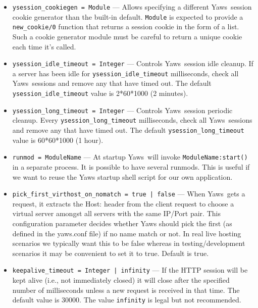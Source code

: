 \documentclass[11pt,oneside,english]{book}
\newcommand{\Yaws}            %
        {{\sc Yaws}}
\begin{document}
\begin{itemize}
\item        \verb+ysession_cookiegen = Module+ ---
               Allows specifying a different \Yaws\ session cookie
               generator than the built-in default. \verb+Module+ is
               expected to provide a \verb+new_cookie/0+ function that
               returns a session cookie in the form of a list. Such a
               cookie generator module must be careful to return a unique
               cookie each time it's called.

\item       \verb+ysession_idle_timeout = Integer+ ---
               Controls \Yaws\ session idle cleanup. If a server has been
               idle for \verb+ysession_idle_timeout+ milliseconds, check
               all \Yaws\ sessions and remove any that have timed out. The
               default \verb+ysession_idle_timeout+ value is 2*60*1000 (2
               minutes).

\item       \verb+ysession_long_timeout = Integer+ ---
               Controls \Yaws\ session periodic cleanup. Every \hfill \break
               \verb+ysession_long_timeout+ milliseconds, check all
               \Yaws\ sessions and remove any that have timed out. The
               default \verb+ysession_long_timeout+ value is 60*60*1000 (1
               hour).

\item        \verb+runmod = ModuleName+ ---
               At startup \Yaws\ will invoke \verb+ModuleName:start()+ in a
               separate process. It is possible to have several runmods.  This
               is useful if we want to reuse the Yaws startup shell script for
               our own application.

\item        \verb+pick_first_virthost_on_nomatch = true | false+ ---
              When \Yaws\ gets a request, it extracts the Host: header from the
              client request to choose a virtual server amongst all servers with
              the same IP/Port pair.  This configuration parameter decides
              whether Yaws should pick the first (as defined in the yaws.conf
              file) if no name match or not.  In real live hosting scenarios we
              typically want this to be false whereas in testing/development
              scenarios it may be convenient to set it to true. Default is true.


\item        \verb+keepalive_timeout = Integer | infinity+ ---
              If the HTTP session will be kept alive (i.e., not
              immediately closed) it will close after the specified
              number of milliseconds unless a new request is received
              in that time. The default value is 30000. The value
              \verb+infinity+ is legal but not recommended.


\end{itemize}
\end{document}
